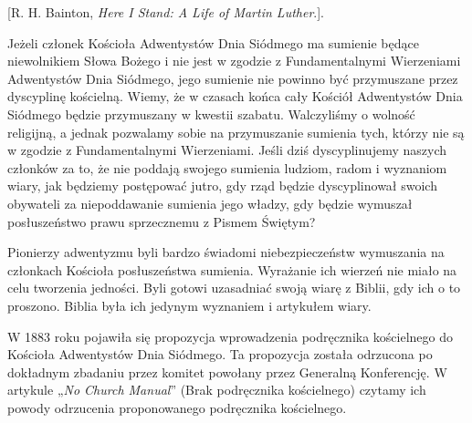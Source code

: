 [R. H. Bainton, \textit{Here I Stand: A Life of Martin Luther}.].

Jeżeli członek Kościoła Adwentystów Dnia Siódmego ma sumienie będące niewolnikiem Słowa Bożego i nie jest w zgodzie z Fundamentalnymi Wierzeniami Adwentystów Dnia Siódmego, jego sumienie nie powinno być przymuszane przez dyscyplinę kościelną. Wiemy, że w czasach końca cały Kościół Adwentystów Dnia Siódmego będzie przymuszany w kwestii szabatu. Walczyliśmy o wolność religijną, a jednak pozwalamy sobie na przymuszanie sumienia tych, którzy nie są w zgodzie z Fundamentalnymi Wierzeniami. Jeśli dziś dyscyplinujemy naszych członków za to, że nie poddają swojego sumienia ludziom, radom i wyznaniom wiary, jak będziemy postępować jutro, gdy rząd będzie dyscyplinował swoich obywateli za niepoddawanie sumienia jego władzy, gdy będzie wymuszał posłuszeństwo prawu sprzecznemu z Pismem Świętym?

Pionierzy adwentyzmu byli bardzo świadomi niebezpieczeństw wymuszania na członkach Kościoła posłuszeństwa sumienia. Wyrażanie ich wierzeń nie miało na celu tworzenia jedności. Byli gotowi uzasadniać swoją wiarę z Biblii, gdy ich o to proszono. Biblia była ich jedynym wyznaniem i artykułem wiary.

W 1883 roku pojawiła się propozycja wprowadzenia podręcznika kościelnego do Kościoła Adwentystów Dnia Siódmego. Ta propozycja została odrzucona po dokładnym zbadaniu przez komitet powołany przez Generalną Konferencję. W artykule „\textit{No Church Manual}” (Brak podręcznika kościelnego) czytamy ich powody odrzucenia proponowanego podręcznika kościelnego.

